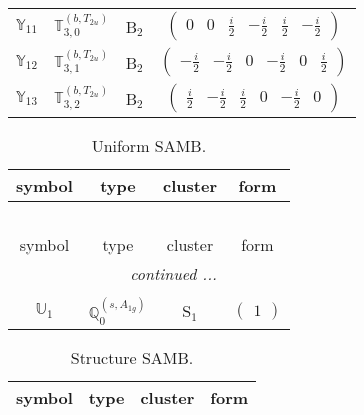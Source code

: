 \documentclass[fleqn,10pt,landscape]{article}
\begin{document}
\begin{itemize}
\begin{center}
\begin{longtable}{c|c|c|c}
$ \mathbb{Y}_{11} $ & $\mathbb{T}_{3,0}^{(b,T_{2u})}$ & B$_{2}$ & $\begin{pmatrix} 0 & 0 & \frac{i}{2} & - \frac{i}{2} & \frac{i}{2} & - \frac{i}{2} \end{pmatrix}$ \\
$ \mathbb{Y}_{12} $ & $\mathbb{T}_{3,1}^{(b,T_{2u})}$ & B$_{2}$ & $\begin{pmatrix} - \frac{i}{2} & - \frac{i}{2} & 0 & - \frac{i}{2} & 0 & \frac{i}{2} \end{pmatrix}$ \\
$ \mathbb{Y}_{13} $ & $\mathbb{T}_{3,2}^{(b,T_{2u})}$ & B$_{2}$ & $\begin{pmatrix} \frac{i}{2} & - \frac{i}{2} & \frac{i}{2} & 0 & - \frac{i}{2} & 0 \end{pmatrix}$ \\
\end{longtable}
\end{center}
\begin{center}
\renewcommand{\arraystretch}{1.3}
\begin{longtable}{c|c|c|c}
\caption{Uniform SAMB.}
 \\
 \hline \hline
symbol & type & cluster & form \\ \hline \endfirsthead

\multicolumn{3}{l}{\tablename\ \thetable{}} \\
 \hline \hline
symbol & type & cluster & form \\ \hline \endhead

 \hline \hline
\multicolumn{3}{r}{\footnotesize\it continued ...} \\ \endfoot

 \hline \hline
\multicolumn{3}{r}{} \\ \endlastfoot

$ \mathbb{U}_{1} $ & $\mathbb{Q}_{0}^{(s,A_{1g})}$ & S$_{1}$ & $\begin{pmatrix} 1 \end{pmatrix}$ \\
\end{longtable}
\end{center}
\begin{center}
\renewcommand{\arraystretch}{1.3}
\begin{longtable}{c|c|c|c}
\caption{Structure SAMB.}
 \\
 \hline \hline
symbol & type & cluster & form \\ \hline \endfirsthead


\end{longtable}
\end{center}
\end{itemize}
\end{document}
